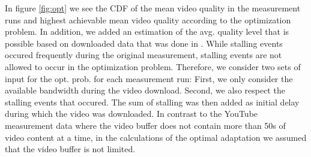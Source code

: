 In figure \ref{fig:opt} we see the CDF of the mean video quality in the measurement runs and highest achievable mean video quality according to the optimization problem. In addition, we added an estimation of the avg. quality level that is possible based on downloaded data that was done in \cite{sieber16sacrificing}. While stalling events occured frequently during the original measurement, stalling events are not allowed to occur in the optimization problem. Therefore, we consider two sets of input for the opt. prob. for each measurement run: First, we only consider the available bandwidth during the video download. Second, we also respect the stalling events that occured. The sum of stalling was then added as initial delay during which the video was downloaded. In contrast to the YouTube measurement data where the video buffer does not contain more than 50s of video content at a time, in the calculations of the optimal adaptation we assumed that the video buffer is not limited.
